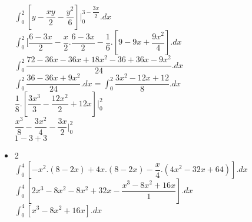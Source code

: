 \documentclass{article}
\begin{document}
\begin{itemize}
	$\int_0^2[y-\dfrac{xy}{2}-\dfrac{y^2}{6}]|_0^{3-\dfrac{3x}{2}}.dx$\\
	
	$\int_0^2 [\dfrac{6-3x}{2}-\dfrac{x}{2}.\dfrac{6-3x}{2}-\dfrac{1}{6}.[9-9x+\dfrac{9x^2}{4}].dx$\\
	$\int_0^2 \dfrac{72-36x-36x+18x^2-36+36x-9x^2}{24}.dx$\\
	$\int_0^2 \dfrac{36-36x+9x^2}{24}.dx = \int_0^2\dfrac{3x^2-12x+12}{8}.dx$\\
	$\dfrac{1}{8}.[\dfrac{3x^3}{3}-\dfrac{12x^2}{2}+12x]|_0^2$\\
	$\dfrac{x^3}{8}-\dfrac{3x^2}{4}-\dfrac{3x}{2}|_0^2$\\
	$1-3+3$
	\item 2\\
	$\int_0^4[ -x^2.(8-2x)+4x.(8-2x)-\dfrac{x}{4}.(4x^2-32x+64)].dx$\\
	$\int_0^4[2x^3-8x^2-8x^2+32x-\dfrac{x^3-8x^2+16x}{1}].dx$\\
	$\int_0^4[x^3-8x^2+16x].dx$
\end{itemize}
\end{document}
